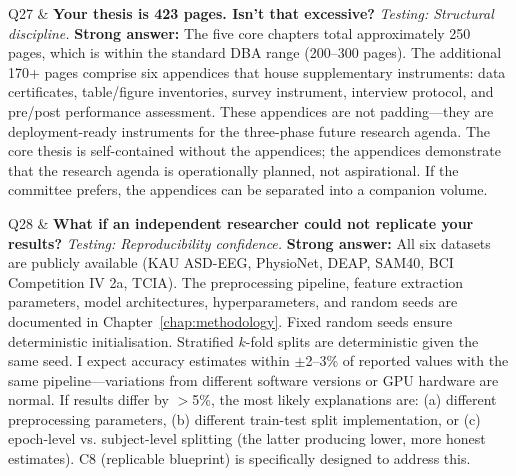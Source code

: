 \begin{xltabular}
Q27 & \textbf{Your thesis is 423 pages. Isn't that excessive?} \newline
\textit{Testing: Structural discipline.} \newline\newline
\textbf{Strong answer:} The five core chapters total approximately 250 pages, which is within the standard DBA range (200--300 pages). The additional 170+ pages comprise six appendices that house supplementary instruments: data certificates, table/figure inventories, survey instrument, interview protocol, and pre/post performance assessment. These appendices are not padding---they are deployment-ready instruments for the three-phase future research agenda. The core thesis is self-contained without the appendices; the appendices demonstrate that the research agenda is operationally planned, not aspirational. If the committee prefers, the appendices can be separated into a companion volume. \\
\addlinespace

Q28 & \textbf{What if an independent researcher could not replicate your results?} \newline
\textit{Testing: Reproducibility confidence.} \newline\newline
\textbf{Strong answer:} All six datasets are publicly available (KAU ASD-EEG, PhysioNet, DEAP, SAM40, BCI Competition IV 2a, TCIA). The preprocessing pipeline, feature extraction parameters, model architectures, hyperparameters, and random seeds are documented in Chapter~\ref{chap:methodology}. Fixed random seeds ensure deterministic initialisation. Stratified $k$-fold splits are deterministic given the same seed. I expect accuracy estimates within $\pm$2--3\% of reported values with the same pipeline---variations from different software versions or GPU hardware are normal. If results differ by $>$5\%, the most likely explanations are: (a) different preprocessing parameters, (b) different train-test split implementation, or (c) epoch-level vs. subject-level splitting (the latter producing lower, more honest estimates). C8 (replicable blueprint) is specifically designed to address this. \\
\addlinespace


\end{xltabular}
